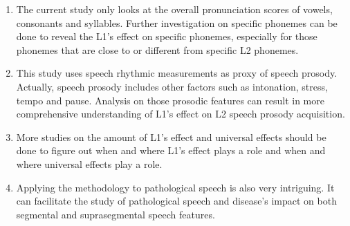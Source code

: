 \begin{enumerate}
\item The current study only looks at the overall pronunciation scores of vowels, consonants and syllables. Further investigation on specific phonemes can be done to reveal the L1's effect on specific phonemes, especially for those phonemes that are close to or different from specific L2 phonemes.
\item This study uses speech rhythmic measurements as proxy of speech prosody. Actually, speech prosody includes other factors such as intonation, stress, tempo and pause. Analysis on those prosodic features can result in more comprehensive understanding of L1's effect on L2 speech prosody acquisition.
\item More studies on the amount of L1's effect and universal effects should be done to figure out when and where L1's effect plays a role and when and where universal effects play a role.
\item Applying the methodology to pathological speech is also very intriguing. It can facilitate the study of pathological speech and disease's impact on both segmental and suprasegmental speech features.
\end{enumerate}
